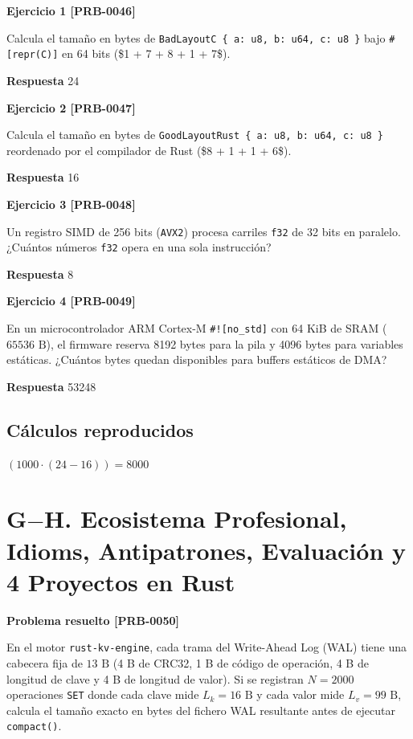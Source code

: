 \documentclass{book}
\begin{document}
\noindent\textbf{Ejercicio 1 [PRB-0046]}

Calcula el tamaño en bytes de \texttt{BadLayoutC \{ a: u8, b: u64, c: u8 \}} bajo \texttt{\#[repr(C)]} en 64 bits (\$1 + 7 + 8 + 1 + 7\$).

\noindent\textbf{Respuesta} 24

\noindent\textbf{Ejercicio 2 [PRB-0047]}

Calcula el tamaño en bytes de \texttt{GoodLayoutRust \{ a: u8, b: u64, c: u8 \}} reordenado por el compilador de Rust (\$8 + 1 + 1 + 6\$).

\noindent\textbf{Respuesta} 16

\noindent\textbf{Ejercicio 3 [PRB-0048]}

Un registro SIMD de 256 bits (\texttt{AVX2}) procesa carriles \texttt{f32} de 32 bits en paralelo. ¿Cuántos números \texttt{f32} opera en una sola instrucción?

\noindent\textbf{Respuesta} 8

\noindent\textbf{Ejercicio 4 [PRB-0049]}

En un microcontrolador ARM Cortex-M \texttt{\#![no\_std]} con 64 KiB de SRAM (\(65536\text{ B}\)), el firmware reserva 8192 bytes para la pila y 4096 bytes para variables estáticas. ¿Cuántos bytes quedan disponibles para buffers estáticos de DMA?

\noindent\textbf{Respuesta} 53248

\subsection*{Cálculos reproducidos}

\(\left(1000\cdot \left(24-16\right)\right) = 8000\)

\section{G\(-\)H. Ecosistema Profesional, Idioms, Antipatrones, Evaluación y 4 Proyectos en Rust}

\noindent\textbf{Problema resuelto [PRB-0050]}

En el motor \texttt{rust-kv-engine}, cada trama del Write-Ahead Log (WAL) tiene una cabecera fija de \(13\text{ B}\) (4 B de CRC32, 1 B de código de operación, 4 B de longitud de clave y 4 B de longitud de valor). Si se registran \(N = 2000\) operaciones \texttt{SET} donde cada clave mide \(L_k = 16\text{ B}\) y cada valor mide \(L_v = 99\text{ B}\), calcula el tamaño exacto en bytes del fichero WAL resultante antes de ejecutar \texttt{compact()}.
\end{document}
